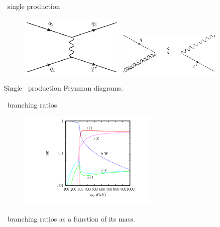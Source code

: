 \begin{frame}{\Tp~single production}
\vspace{-.2cm}
\begin{figure}[!Hhtbp]
  \begin{center}
    \includegraphics[width=0.45\textwidth]{../figs/Tchannel_T_single.jpg}
    \includegraphics[width=0.45\textwidth]{../figs/QuarkGluonFusion_SingleT.jpg}
  \end{center}
\end{figure}

\vspace{-.2cm}
    \begin{block}{}
      \tiny \centering Single \Tp~production Feynman diagrams.
    \end{block}

\end{frame}

\begin{frame}{\Tp~branching ratios}
\vspace{-.2cm}
\begin{figure}[!Hhtbp]
  \begin{center}
    \includegraphics[width=0.6\textwidth]{../figs/pheno_br_tp.png}
  \end{center}
\end{figure}

\vspace{-.2cm}
    \begin{block}{}
      \tiny \centering \Tp~branching ratios as a function of its mass.
    \end{block}

\end{frame}

